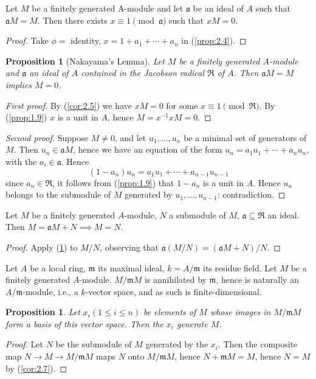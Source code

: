 \documentclass{standalone}
\newtheorem{proposition}[theorem]{Proposition}
\theoremstyle{definition}
\theoremstyle{remark}
\begin{document}
\begin{corollary}\label{cor:2.5}
Let $M$ be a finitely generated A-module and let $\mathfrak{a}$
be an ideal of $A$ such that $\mathfrak{a} M=M$. Then there exists $x
\equiv 1\pmod{\mathfrak{a}}$ such that $x M=0$.
\end{corollary}
\begin{proof}
  Take $\phi=$ identity, $x=1+a_{1}+\cdots+a_{n}$ in (\ref{prop:2.4}).
\end{proof}
\begin{proposition}
[Nakayama's Lemma]\label{prop:2.6} Let $M$ be a finitely generated $A$-module
and $\mathfrak{a}$ an ideal of $A$ contained in the Jacobson radical
$\mathfrak{R}$ of $A$. Then $\mathfrak{a} M=M$ implies $M=0$.
\end{proposition}
\begin{proof}[First proof]
By (\ref{cor:2.5}) we have $x M=0$ for some $x \equiv 1\pmod{\Re}$. By (\ref{prop:1.9})
$x$ is a unit in $A$, hence $M=x^{-1} x M=0$.
\end{proof}
\begin{proof}[Second proof]
Suppose
$M \neq 0$, and let $u_{1}, \ldots, u_{n}$ be a minimal set of generators of
$M$. Then $u_{n} \in \mathfrak{a} M$, hence we have an equation of the form
$u_{n}=a_{1} u_{1}+\cdots+a_{n} u_{n}$, with the $a_{i} \in \mathfrak{a}$.
Hence
\[
  (1-a_{n}) u_{n}=a_{1} u_{1}+\cdots+a_{n-1} u_{n-1}
\]
since $a_{n} \in \Re$, it follows from (\ref{prop:1.9}) that $1-a_{n}$ is a unit in $A$.
Hence $u_{n}$ belongs to the submodule of $M$ generated by
$u_{1}, \ldots, u_{n-1}$: contradiction.
\end{proof}
\begin{corollary}\label{cor:2.7}
Let $M$ be a finitely generated $A$-module, $N$ a submodule of
$M$, $\mathfrak{a} \subseteq \Re$ an ideal. Then
$M=\mathfrak{a} M+N \implies M=N$.
\end{corollary}
\begin{proof}
  Apply (\ref{prop:2.6}) to $M / N$, observing that
$\mathfrak{a}(M / N)=(\mathfrak{a} M+N) / N$.
\end{proof}

Let $A$ be a local ring, $\mathfrak{m}$ its maximal ideal, $k=A / \mathfrak{m}$
its residue field. Let $M$ be a finitely generated $A$-module.
$M / \mathfrak{m} M$ is annihilated by $\mathfrak{m}$, hence is naturally an
$A / \mathfrak{m}$-module, i.e., a $k$-vector space, and as such is
finite-dimensional.
\begin{proposition}
Let $x_{i}(1 \le i \le n)$ be elements of $M$ whose
images in $M / \mathfrak{m} M$ form a basis of this vector space. Then the
$x_{i}$ generate $M$.
\end{proposition}
\begin{proof}
Let $N$ be the submodule of $M$ generated by the $x_{i}$. Then the
composite map $N \to M \to M / \mathfrak{m} M$ maps $N$ onto
$M / \mathfrak{m} M$, hence $N+\mathfrak{m} M=M$, hence $N=M$ by (\ref{cor:2.7}).
\end{proof}
\end{document}
